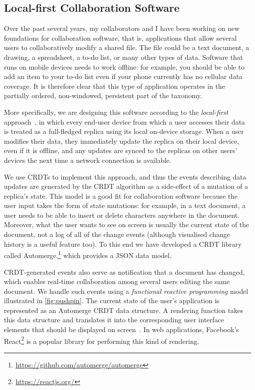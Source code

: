 \documentclass[sigconf]{acmart}
\begin{document}
\subsection{Local-first Collaboration Software}\label{sec:collaboration}

Over the past several years, my collaborators and I have been working on new foundations for collaboration software, that is, applications that allow several users to collaboratively modify a shared file.
The file could be a text document, a drawing, a spreadsheet, a to-do list, or many other types of data.
Software that runs on mobile devices needs to work offline: for example, you should be able to add an item to your to-do list even if your phone currently has no cellular data coverage.
It is therefore clear that this type of application operates in the partially ordered, non-windowed, persistent part of the taxonomy.

More specifically, we are designing this software according to the \emph{local-first} approach~\cite{Kleppmann:2019}, in which every end-user device from which a user accesses their data is treated as a full-fledged replica using its local on-device storage.
When a user modifies their data, they immediately update the replica on their local device, even if it is offline, and any updates are synced to the replicas on other users' devices the next time a network connection is available.

We use CRDTs to implement this approach, and thus the events describing data updates are generated by the CRDT algorithm as a side-effect of a mutation of a replica's state.
This model is a good fit for collaboration software because the user input takes the form of state mutations: for example, in a text document, a user needs to be able to insert or delete characters anywhere in the document.
Moreover, what the user wants to see on screen is usually the current state of the document, not a log of all of the change events (although visualised change history is a useful feature too).
To this end we have developed a CRDT library called Automerge,\footnote{\url{https://github.com/automerge/automerge}} which provides a JSON data model.

CRDT-generated events also serve as notification that a document has changed, which enables real-time collaboration among several users editing the same document.
We handle such events using a \emph{functional reactive programming} model illustrated in \autoref{fig:pushpin}.
The current state of the user's application is represented as an Automerge CRDT data structure.
A rendering function takes this data structure and translates it into the corresponding user interface elements that should be displayed on screen~\cite{vanHardenberg:2020}.
In web applications, Facebook's React\footnote{\url{https://reactjs.org/}} is a popular library for performing this kind of rendering.
\end{document}
